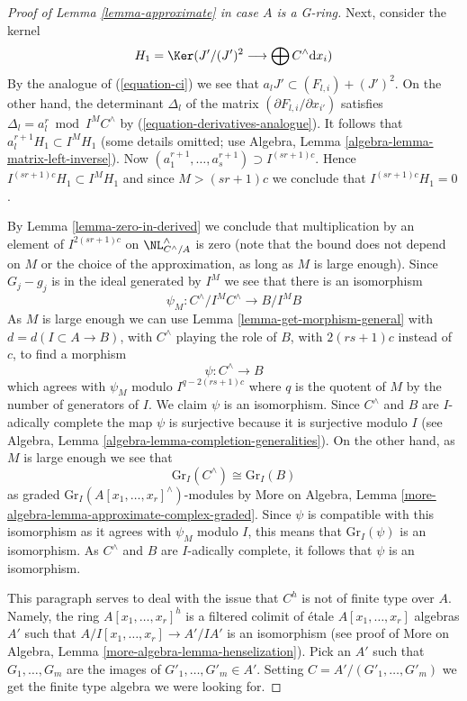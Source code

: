 \begin{proof}[Proof of Lemma \ref{lemma-approximate} in case $A$ is a G-ring]
\medskip\noindent
Next, consider the kernel
$$
H_1 = \Ker(J'/(J')^2 \longrightarrow \bigoplus C^\wedge \text{d}x_i)
$$
By the analogue of (\ref{equation-ci}) we see that
$a_l J' \subset (F_{l, i}) + (J')^2$. On the other hand, the
determinant $\Delta_l$ of the matrix $(\partial F_{l, i}/ \partial x_{i'})$
satisfies $\Delta_l = a_l^r \bmod I^M C^\wedge$ by
(\ref{equation-derivatives-analogue}). It follows that
$a_l^{r + 1} H_1 \subset I^M H_1$ (some details omitted; use
Algebra, Lemma \ref{algebra-lemma-matrix-left-inverse}).
Now $(a_1^{r + 1}, \ldots, a_s^{r + 1}) \supset I^{(sr + 1)c}$.
Hence $I^{(sr + 1)c}H_1 \subset I^M H_1$ and since $M > (sr + 1)c$
we conclude that $I^{(sr + 1)c}H_1 = 0$.

\medskip\noindent
By Lemma \ref{lemma-zero-in-derived}
we conclude that multiplication by an element
of $I^{2(sr + 1)c}$ on $\NL^\wedge_{C^\wedge/A}$ is zero
(note that the bound does not depend on $M$ or the choice
of the approximation, as long as $M$ is large enough).
Since $G_j - g_j$ is in the ideal generated by $I^M$
we see that there is an isomorphism
$$
\psi_M : C^\wedge/I^MC^\wedge \to B/I^MB
$$
As $M$ is large enough we can use
Lemma \ref{lemma-get-morphism-general}
with $d = d(I \subset A \to B)$,
with $C^\wedge$ playing the role of $B$,
with $2(rs + 1)c$ instead of $c$,
to find a morphism
$$
\psi : C^\wedge \longrightarrow B
$$
which agrees with $\psi_M$ modulo $I^{q - 2(rs + 1)c}$ where
$q$ is the quotent of $M$ by the number of generators of $I$.
We claim $\psi$ is an isomorphism. Since $C^\wedge$ and $B$
are $I$-adically complete the map $\psi$ is surjective
because it is surjective modulo $I$ (see
Algebra, Lemma \ref{algebra-lemma-completion-generalities}).
On the other hand, as $M$ is large enough we see that
$$
\text{Gr}_I(C^\wedge) \cong \text{Gr}_I(B)
$$
as graded $\text{Gr}_I(A[x_1, \ldots, x_r]^\wedge)$-modules
by More on Algebra, Lemma \ref{more-algebra-lemma-approximate-complex-graded}.
Since $\psi$ is compatible with this isomorphism as it
agrees with $\psi_M$ modulo $I$, this means that $\text{Gr}_I(\psi)$ is an
isomorphism. As $C^\wedge$ and $B$ are
$I$-adically complete, it follows that $\psi$ is an isomorphism.

\medskip\noindent
This paragraph serves to deal with the issue that $C^h$
is not of finite type over $A$. Namely, the ring
$A[x_1, \ldots, x_r]^h$ is a filtered colimit of
\'etale $A[x_1, \ldots, x_r]$ algebras $A'$ such that
$A/I[x_1, \ldots, x_r] \to A'/IA'$ is an isomorphism
(see proof of More on Algebra, Lemma \ref{more-algebra-lemma-henselization}).
Pick an $A'$ such that $G_1, \ldots, G_m$ are the
images of $G'_1, \ldots, G'_m \in A'$.
Setting $C = A'/(G'_1, \ldots, G'_m)$ we get the finite
type algebra we were looking for.
\end{proof}

